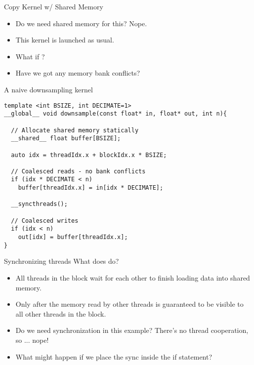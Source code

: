 \documentclass[aspectratio=43]{beamer}
\begin{document}
\begin{frame}[fragile]{Copy Kernel w/ Shared Memory}
    \begin{itemize}
        \item Do we need shared memory for this? Nope.
        \item This kernel is launched as usual.
        \item What if ?
        \item Have we got any memory bank conflicts?
    \end{itemize}

    \begin{code}{A naive downsampling kernel}
        \begin{lstlisting}[style=boxcudatiny]
template <int BSIZE, int DECIMATE=1>
__global__ void downsample(const float* in, float* out, int n){

  // Allocate shared memory statically
  __shared__ float buffer[BSIZE];

  auto idx = threadIdx.x + blockIdx.x * BSIZE;

  // Coalesced reads - no bank conflicts
  if (idx * DECIMATE < n)
    buffer[threadIdx.x] = in[idx * DECIMATE];

  __syncthreads();

  // Coalesced writes
  if (idx < n)
    out[idx] = buffer[threadIdx.x];
}
        \end{lstlisting}
    \end{code}

\end{frame}

\begin{frame}[fragile]{Synchronizing threads}
    What does  do?
    
    \begin{itemize}
        \item All threads in the block wait for each other to finish loading data into shared memory.
        \item Only after  the memory read by other threads is guaranteed to be visible to all other threads in the block.
        \item Do we need synchronization in this example? There's no thread cooperation, so ... nope!
        \item What might happen if we place the sync inside the if statement?
        
    \end{itemize}
\end{frame}
\end{document}
